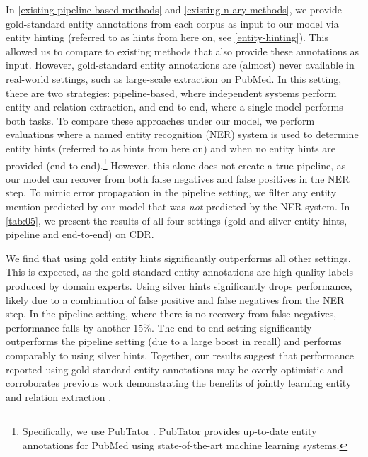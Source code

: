\documentclass[11pt]{article}
\begin{document}
In \textsection \ref{existing-pipeline-based-methods} and \textsection \ref{existing-n-ary-methods}, we provide gold-standard entity annotations from each corpus as input to our model via entity hinting (referred to as  hints from here on, see \textsection \ref{entity-hinting}). This allowed us to compare to existing methods that also provide these annotations as input. However, gold-standard entity annotations are (almost) never available in real-world settings, such as large-scale extraction on PubMed. In this setting, there are two strategies: pipeline-based, where independent systems perform entity and relation extraction, and end-to-end, where a single model performs both tasks. To compare these approaches under our model, we perform evaluations where a named entity recognition (NER) system is used to determine entity hints (referred to as  hints from here on) and when no entity hints are provided (end-to-end).\footnote{Specifically, we use PubTator \citep{wei2013pubtator}. PubTator provides up-to-date entity annotations for PubMed using state-of-the-art machine learning systems.}  However, this alone does not create a true pipeline, as our model can recover from both false negatives and false positives in the NER step. To mimic error propagation in the pipeline setting, we filter any entity mention predicted by our model that was \textit{not} predicted by the NER system. In \autoref{tab:05}, we present the results of all four settings (gold and silver entity hints, pipeline and end-to-end) on CDR.

We find that using gold entity hints significantly outperforms all other settings. This is expected, as the gold-standard entity annotations are high-quality labels produced by domain experts. Using silver hints significantly drops performance, likely due to a combination of false positive and false negatives from the NER step. In the pipeline setting, where there is no recovery from false negatives, performance falls by another 15\%. The end-to-end setting significantly outperforms the pipeline setting (due to a large boost in recall) and performs comparably to using silver hints. Together, our results suggest that performance reported using gold-standard entity annotations may be overly optimistic and corroborates previous work demonstrating the benefits of jointly learning entity and relation extraction \citep{miwa2014modeling, miwa2016end, gupta2016table, li2016joint, li2017neural, nguyen2019, yu2020joint}.
\end{document}
